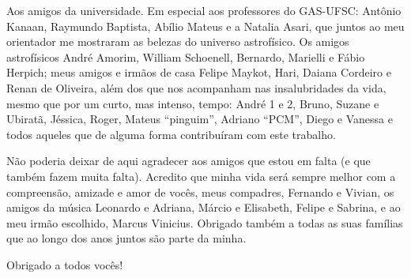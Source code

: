 Aos amigos da universidade. Em especial aos professores do GAS-UFSC: Antônio Kanaan, Raymundo Baptista, Abílio Mateus e
a Natalia Asari, que juntos ao meu orientador me mostraram as belezas do universo astrofísico. Os amigos astrofísicos
André Amorim, William Schoenell, Bernardo, Marielli e Fábio Herpich; meus amigos e irmãos de casa Felipe Maykot, Hari,
Daiana Cordeiro e Renan de Oliveira, além dos que nos acompanham nas insalubridades da vida, mesmo que por um curto, mas
intenso, tempo: André 1 e 2, Bruno, Suzane e Ubiratã, Jéssica, Roger, Mateus ``pinguim'', Adriano ``PCM'', Diego e
Vanessa e todos aqueles que de alguma forma contribuíram com este trabalho.

Não poderia deixar de aqui agradecer aos amigos que estou em falta (e que também fazem muita falta). Acredito que minha
vida será sempre melhor com a compreensão, amizade e amor de vocês, meus compadres, Fernando e Vivian, os amigos da
música Leonardo e Adriana, Márcio e Elisabeth, Felipe e Sabrina, e ao meu irmão escolhido, Marcus Vinicius. Obrigado
também a todas as suas famílias que ao longo dos anos juntos são parte da minha.

Obrigado a todos vocês!

